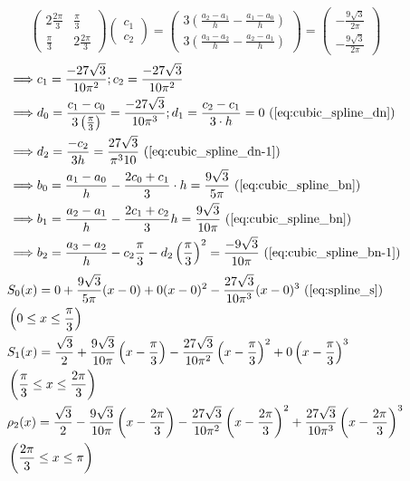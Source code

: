 \begin{equation}
\left(\begin{array}{cc}
2 \frac{2 \pi}{3} & \frac{\pi}{3} \\
\frac{\pi}{3} & 2 \frac{2 \pi}{3}
\end{array}\right)\left(\begin{array}{l}
c_1 \\
c_2
\end{array}\right)=\left(\begin{array}{c}
3\left(\frac{a_2-a_1}{h}-\frac{a_1-a_0}{h}\right) \\
3\left(\frac{a_3-a_2}{h}-\frac{a_2-a_1}{h}\right)
\end{array}\right)=\left(\begin{array}{c}
-\frac{9 \sqrt{3}}{2 \pi} \\
-\frac{9 \sqrt{3}}{2 \pi}
\end{array}\right)
\end{equation}
$$
\begin{aligned}
&\Longrightarrow c_1=\frac{-27 \sqrt{3}}{10 \pi^2} ; c_2=\frac{-27 \sqrt{3}}{10 \pi^2}\\
&\Longrightarrow d_0=\frac{c_1-c_0}{3\left(\frac{\pi}{3}\right)}=\frac{-27 \sqrt{3}}{10 \pi^3} ; d_1=\frac{c_2-c_1}{3 \cdot h}=0 \text{ (\autoref{eq:cubic_spline_dn})} \\
&\Longrightarrow d_2=\frac{-c_2}{3 h}=\frac{27 \sqrt{3}}{\pi^3 10} \text{ (\autoref{eq:cubic_spline_dn-1})} \\
&\Longrightarrow b_0=\frac{a_1-a_0}{h}-\frac{2 c_0+c_1}{3} \cdot h=\frac{9 \sqrt{3}}{5 \pi} \text{ (\autoref{eq:cubic_spline_bn})}\\
&\Longrightarrow b_1=\frac{a_2-a_1}{h}-\frac{2 c_1+c_2}{3} h=\frac{9 \sqrt{3}}{10 \pi} \text{ (\autoref{eq:cubic_spline_bn})}\\
&\Longrightarrow b_2=\frac{a_3-a_2}{h}-c_2 \frac{\pi}{3}-d_2\left(\frac{\pi}{3}\right)^2=\frac{-9 \sqrt{3}}{10 \pi}\text{ (\autoref{eq:cubic_spline_bn-1})}
\end{aligned}
$$
$$
\begin{aligned}
&S_0(x)=0+\frac{9 \sqrt{3}}{5 \pi}(x-0)+0(x-0)^2-\frac{27 \sqrt{3}}{10 \pi^3}(x-0)^3 \text{ (\autoref{eq:spline_s})}\\
&\left(0 \leq x \leq \frac{\pi}{3}\right) \\
&S_1(x)=\frac{\sqrt{3}}{2}+\frac{9 \sqrt{3}}{10 \pi}\left(x-\frac{\pi}{3}\right)-\frac{27 \sqrt{3}}{10 \pi^2}\left(x-\frac{\pi}{3}\right)^2+0\left(x-\frac{\pi}{3}\right)^3 \\
&\left(\frac{\pi}{3} \leq x \leq \frac{2 \pi}{3}\right) \\
&\rho_2(x)=\frac{\sqrt{3}}{2}-\frac{9 \sqrt{3}}{10 \pi}\left(x-\frac{2 \pi}{3}\right)-\frac{27 \sqrt{3}}{10 \pi^2}\left(x-\frac{2 \pi}{3}\right)^2+\frac{27 \sqrt{3}}{10 \pi^3}\left(x-\frac{2 \pi}{3}\right)^3 \\
&\left(\frac{2 \pi}{3} \leq x \leq \pi\right)
\end{aligned}
$$


